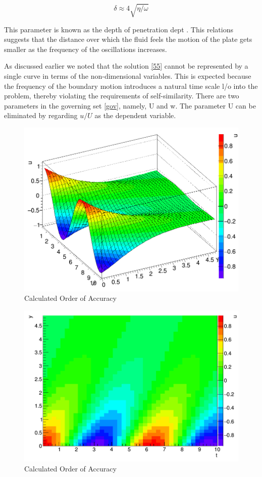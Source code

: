 \documentclass[paper=a4, fontsize=12pt, abstract=on]{scrartcl}
\numberwithin{equation}{section}		%
\numberwithin{figure}{section}			%
\numberwithin{table}{section}				%
\begin{document}
\begin{equation}
\label{56}
\delta \approx 4\sqrt{\eta/\omega}
\end{equation}

This parameter is known as the depth of penetration dept \cite{g}. This relations suggests that the distance over which the fluid feels the motion of the plate gets smaller as the frequency of the oscillations increases. 



As discussed earlier we noted that the solution \ref{55} cannot be represented by a single curve in terms of the non-dimensional variables. This is expected because the frequency of the boundary motion introduces a natural time scale l/o into the problem, thereby violating the requirements of self-similarity. There are two parameters in the governing set \ref{gov}, namely, U and w. The parameter U can be eliminated by regarding $u / U$ as the dependent variable. 



\begin{figure}[H]
\centering
\includegraphics[width=0.70\linewidth]{q2}
\caption{Calculated Order of Accuracy}
\label{ord}
\end{figure}

\begin{figure}[H]
\centering
\includegraphics[width=0.70\linewidth]{q3}
\caption{Calculated Order of Accuracy}
\label{ord}
\end{figure}
\end{document}
